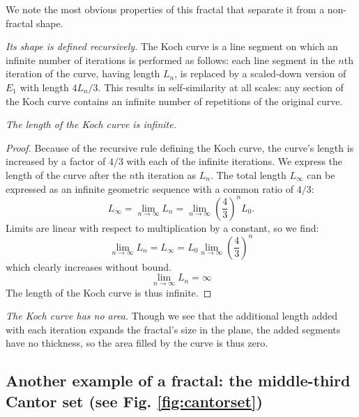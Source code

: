 We note the most obvious properties of this fractal that separate it from a non-fractal shape. 

\begin{myobs}\textit{Its shape is defined recursively.} The Koch curve is a line segment on which an infinite number of iterations is performed as follows: each line segment in the $n$th iteration of the curve, having length $L_n$, is replaced by a scaled-down version of $E_1$ with length $4L_n/3$. This results in self-similarity at all scales: any section of the Koch curve contains an infinite number of repetitions of the original curve.\end{myobs}

\begin{myobs}\textit{The length of the Koch curve is infinite.}\end{myobs}

\begin{proof}
Because of the recursive rule defining the Koch curve, the curve's length is increased by a factor of $ 4/3 $ with each of the infinite iterations. We express the length of the curve after the $n$th iteration as $L_n$. The total length $L_\infty$ can be expressed as an infinite geometric sequence with a common ratio of $ 4/3 $:
\begin{equation}
	L_\infty = \lim_{n \to \infty}L_n = \lim_{n \to \infty}\left(\frac{4}{3}\right)^n L_0.
\end{equation}
Limits are linear with respect to multiplication by a constant, so we find:
\begin{equation}
	\lim_{n \to \infty}L_n = L_\infty = L_0 \lim_{n \to \infty} \left(\frac{4}{3}\right)^n
\end{equation}
which clearly increases without bound.
\begin{equation}
	\lim_{n \to \infty}L_n = \infty 
\end{equation}
The length of the Koch curve is thus infinite.
\end{proof}

\begin{myobs}\textit{The Koch curve has no area.} Though we see that the additional length added with each iteration expands the fractal's size in the plane, the added segments have no thickness, so the area filled by the curve is thus zero.\end{myobs}


\subsection{Another example of a fractal: the middle-third Cantor set (see Fig. \ref{fig:cantorset})}

